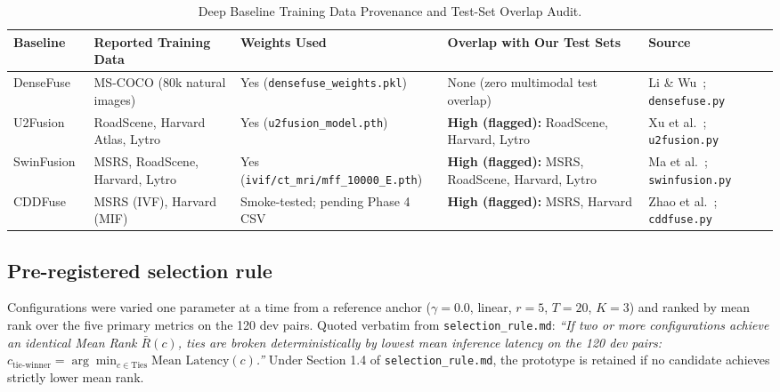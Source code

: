 \documentclass[conference]{IEEEtran}
\begin{document}
\begin{table}[htbp]
\caption{Deep Baseline Training Data Provenance and Test-Set Overlap Audit.}
\label{tab:provenance}
\centering
\begin{tabular}{lllp{4.8cm}l}
\toprule
\textbf{Baseline} & \textbf{Reported Training Data} & \textbf{Weights Used} & \textbf{Overlap with Our Test Sets} & \textbf{Source} \\
\midrule
DenseFuse~\cite{li2019densefuse} & MS-COCO (80k natural images) & Yes (\texttt{densefuse\_weights.pkl}) & None (zero multimodal test overlap) & Li \& Wu~\cite{li2019densefuse}; \texttt{densefuse.py} \\
U2Fusion~\cite{xu2022u2fusion} & RoadScene, Harvard Atlas, Lytro & Yes (\texttt{u2fusion\_model.pth}) & \textbf{High (flagged):} RoadScene, Harvard, Lytro & Xu et al.~\cite{xu2022u2fusion}; \texttt{u2fusion.py} \\
SwinFusion~\cite{ma2022swinfusion} & MSRS, RoadScene, Harvard, Lytro & Yes (\texttt{ivif/ct\_mri/mff\_10000\_E.pth}) & \textbf{High (flagged):} MSRS, RoadScene, Harvard, Lytro & Ma et al.~\cite{ma2022swinfusion}; \texttt{swinfusion.py} \\
CDDFuse~\cite{zhao2023cddfuse} & MSRS (IVF), Harvard (MIF) & Smoke-tested; pending Phase 4 CSV & \textbf{High (flagged):} MSRS, Harvard & Zhao et al.~\cite{zhao2023cddfuse}; \texttt{cddfuse.py} \\
\bottomrule
\end{tabular}
\end{table}

\subsection{Pre-registered selection rule}
Configurations were varied one parameter at a time from a reference anchor ($\gamma=0.0$, linear, $r=5$, $T=20$, $K=3$) and ranked by mean rank over the five primary metrics on the 120 dev pairs. Quoted verbatim from \texttt{selection\_rule.md}: \emph{``If two or more configurations achieve an identical Mean Rank $\bar{R}(c)$, ties are broken deterministically by lowest mean inference latency on the 120 dev pairs: $c_{\text{tie-winner}} = \arg\min_{c \in \text{Ties}} \text{Mean Latency}(c)$.''} Under Section 1.4 of \texttt{selection\_rule.md}, the prototype is retained if no candidate achieves strictly lower mean rank.
\end{document}
